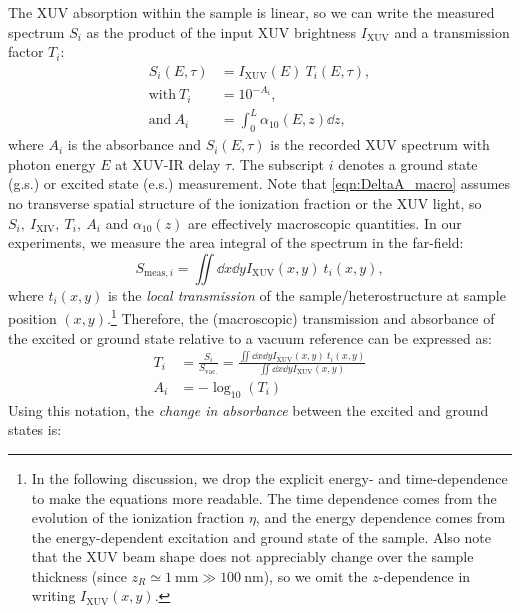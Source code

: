 The XUV absorption within the sample is linear, so we can write the measured spectrum $S_i$ as the product of the input XUV brightness $I_{\textrm{XUV}}$ and a transmission factor $T_i$:
\begin{equation}
\begin{aligned}
S_i(E, \tau) &= I_{\textrm{XUV}}(E) \ T_i(E, \tau), \\
\textrm{with} \ T_i &= 10^{- A_i}, \\
\textrm{and} \ A_i &= \int_{0}^{L} \alpha_{10}(E, z) \dd{z},
\end{aligned}
\label{eqn:DeltaA_macro}
\end{equation}
where $A_i$ is the absorbance and $S_i(E,\tau)$ is the recorded XUV spectrum with photon energy $E$ at XUV-IR delay $\tau$. The subscript $i$ denotes a ground state (g.s.) or excited state (e.s.) measurement. Note that \cref{eqn:DeltaA_macro} assumes no transverse spatial structure of the ionization fraction or the XUV light, so $S_i, \ I_{\textrm{XIV}}, \ T_i, \ A_i$ and $\alpha_{10}(z)$ are effectively macroscopic quantities. In our experiments, we measure the area integral of the spectrum in the far-field:
\begin{equation}
S_{\textrm{meas},i} = \iint \dd{x} \dd{y} I_{\textrm{XUV}}(x,y) \ t_i(x,y),
\end{equation}
where $t_i(x,y)$ is the \textit{local transmission} of the sample/heterostructure at sample position $(x,y)$.\footnote{In the following discussion, we drop the explicit energy- and time-dependence to make the equations more readable. The time dependence comes from the evolution of the ionization fraction $\eta$, and the energy dependence comes from the energy-dependent excitation and ground state of the sample. Also note that the XUV beam shape does not appreciably change over the sample thickness (since $z_R \simeq 1 \ \textrm{mm} \gg 100 \ \textrm{nm}$), so we omit the $z$-dependence in writing $I_{\textrm{XUV}}(x,y)$.}  Therefore, the (macroscopic) transmission and absorbance of the excited or ground state relative to a vacuum reference can be expressed as:
\begin{equation}
\begin{aligned}
T_i &= \frac{S_i}{S_{\textrm{vac.}}} = \frac{\iint \dd{x} \dd{y} I_{\textrm{XUV}}(x,y) \ t_i(x,y)}{ \iint \dd{x} \dd{y} I_{\textrm{XUV}}(x,y)} \\
A_i &= - \log_{10}(T_i)
\end{aligned}
\end{equation}
Using this notation, the \textit{change in absorbance} between the excited and ground states is:

